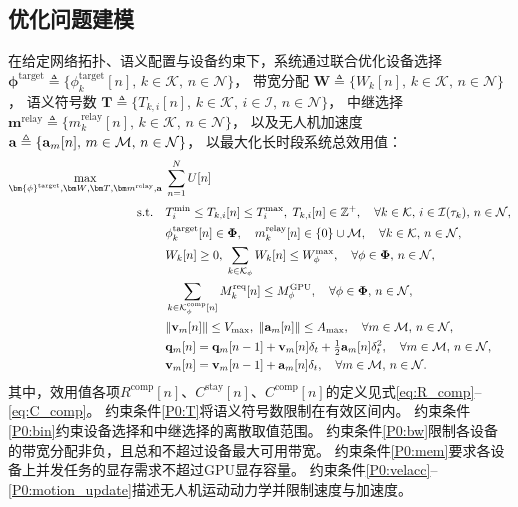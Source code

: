 \subsection{优化问题建模}
在给定网络拓扑、语义配置与设备约束下，系统通过联合优化设备选择
$\bm{\phi}^{\text{target}}\triangleq\{\phi_k^{\text{target}}[n],\, k \in \mathcal{K},\,n \in \mathcal{N}\}$，
带宽分配
${\bm W}\triangleq\{W_k[n],\, k \in \mathcal{K},\,n \in \mathcal{N}\}$，
语义符号数
${\bm T}\triangleq\{T_{k,i}[n],\,k \in \mathcal{K},\,i\in\mathcal{I},\,n \in \mathcal{N}\}$，
中继选择
${\bm m}^{\text{relay}}\triangleq\{m_k^{\text{relay}}[n],\,k \in \mathcal{K},\,n \in \mathcal{N}\}$，
以及无人机加速度
${\bf a}\triangleq\{{\bf a}_m[n],\,m\in\mathcal{M},\,n \in \mathcal{N}\}$，
以最大化长时段系统总效用值：
\begin{subequations}\label{P0:QoE}
\begin{align}
\mathop{\max}\limits_{\bm{\phi}^{\text{target}},{\bm W},{\bm T},{\bm m}^{\text{relay}},{\bf a}}\;
& \sum_{n=1}^{N} U[n] \label{P0:ob}\\[3pt]
\text{s.t.}\quad
& T_i^{\min} \le T_{k,i}[n] \le T_i^{\max},\; T_{k,i}[n]\in \mathbb{Z}^+,\quad \forall k\in\mathcal{K},\, i\in\mathcal{I}(\tau_k),\, n\in\mathcal{N},\label{P0:T}\\
& \phi_k^{\text{target}}[n]\in\boldsymbol{\Phi},\quad m_k^{\text{relay}}[n]\in\{0\}\cup\mathcal{M},\quad \forall k\in\mathcal{K},\, n\in\mathcal{N},\label{P0:bin}\\
& W_k[n] \ge 0,\;\sum_{k\in\mathcal{K}_\phi} W_k[n] \le W_\phi^{\max},\quad \forall \phi\in\boldsymbol{\Phi},\, n\in\mathcal{N},\label{P0:bw}\\
& \sum_{k \in \mathcal{K}_\phi^{\text{comp}}[n]} M_k^{\text{req}}[n] \leq M_\phi^{\text{GPU}},\quad \forall \phi\in\boldsymbol{\Phi},\, n\in\mathcal{N},\label{P0:mem}\\
& \|{\bf v}_m[n]\|\le V_{\max},\;\|{\bf a}_m[n]\|\le A_{\max},\quad \forall m\in\mathcal{M},\,n\in\mathcal{N},\label{P0:velacc}\\
& {\bf q}_m[n]={\bf q}_m[n-1]+{\bf v}_m[n]\delta_t+\tfrac{1}{2}{\bf a}_m[n]\delta_t^2,\quad \forall m\in\mathcal{M},\,n\in\mathcal{N},\label{P0:dynamics}\\
& {\bf v}_m[n]={\bf v}_m[n-1]+{\bf a}_m[n]\delta_t,\quad \forall m\in\mathcal{M},\,n\in\mathcal{N}.\label{P0:motion_update}
\end{align}
\end{subequations}
其中，效用值各项$R^{\text{comp}}[n]$、$C^{\text{stay}}[n]$、$C^{\text{comp}}[n]$的定义见式\eqref{eq:R_comp}--\eqref{eq:C_comp}。
约束条件\eqref{P0:T}将语义符号数限制在有效区间内。
约束条件\eqref{P0:bin}约束设备选择和中继选择的离散取值范围。
约束条件\eqref{P0:bw}限制各设备的带宽分配非负，且总和不超过设备最大可用带宽。
约束条件\eqref{P0:mem}要求各设备上并发任务的显存需求不超过GPU显存容量。
约束条件\eqref{P0:velacc}--\eqref{P0:motion_update}描述无人机运动动力学并限制速度与加速度。


